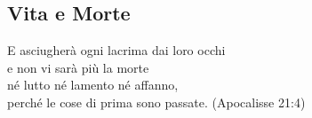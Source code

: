 \documentclass[12pt,a4paper,twoside,openany]{book}
\begin{document}
\pagebreak

\subsection{Vita e Morte}\label{morire}

\begin{changemargin}{0.3cm}{0.3cm}\begin{enfasi}{E asciugherà ogni lacrima dai loro occhi\\
e non vi sarà più la morte\\
né lutto né lamento né affanno,\\
perché le cose di prima sono passate. (Apocalisse 21:4)
}\end{enfasi}\end{changemargin}\medskip
\end{document}
